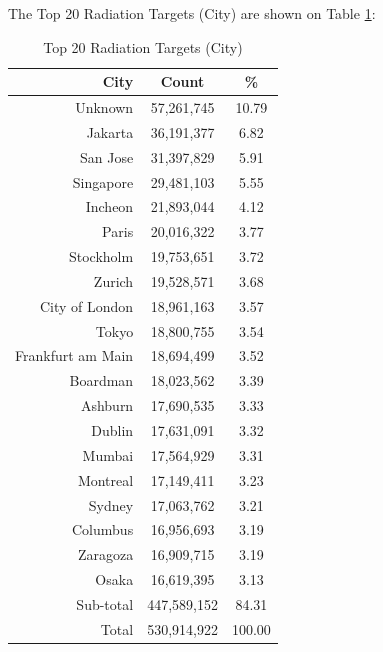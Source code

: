 \newpage
The Top 20 Radiation Targets (City) are shown on Table \ref{tab:top20radiationtargets(city)}:
\begin{table}[!h]
\begin{center}
\caption{Top 20 Radiation Targets (City)}
\label{tab:top20radiationtargets(city)}
\begin{tabular}{ |r|c|c| }
\hline
\centering City & Count & \%  \\
\hline
Unknown & 57,261,745 & 10.79  \\
Jakarta & 36,191,377 & 6.82  \\
San Jose & 31,397,829 & 5.91  \\
Singapore & 29,481,103 & 5.55  \\
Incheon & 21,893,044 & 4.12  \\
Paris & 20,016,322 & 3.77  \\
Stockholm & 19,753,651 & 3.72  \\
Zurich & 19,528,571 & 3.68  \\
City of London & 18,961,163 & 3.57  \\
Tokyo & 18,800,755 & 3.54  \\
Frankfurt am Main & 18,694,499 & 3.52  \\
Boardman & 18,023,562 & 3.39  \\
Ashburn & 17,690,535 & 3.33  \\
Dublin & 17,631,091 & 3.32  \\
Mumbai & 17,564,929 & 3.31  \\
Montreal & 17,149,411 & 3.23  \\
Sydney & 17,063,762 & 3.21  \\
Columbus & 16,956,693 & 3.19  \\
Zaragoza & 16,909,715 & 3.19  \\
Osaka & 16,619,395 & 3.13  \\
\hline
Sub-total & 447,589,152 & 84.31  \\
\hline
Total & 530,914,922 & 100.00  \\
\hline
\end{tabular}
\end{center}
\end{table}

